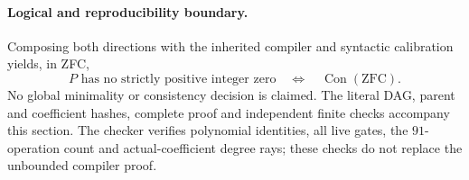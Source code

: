 \paragraph{Logical and reproducibility boundary.}
Composing both directions with the inherited compiler and syntactic
calibration yields, in ZFC,
\[
\text{$P$ has no strictly positive integer zero}
\quad\Longleftrightarrow\quad \operatorname{Con}(\mathrm{ZFC}).
\]
No global minimality or consistency decision is claimed. The literal DAG,
parent and coefficient hashes, complete proof and independent finite
checks accompany this section. The checker verifies polynomial identities,
all live gates, the $91$-operation count and actual-coefficient degree rays;
these checks do not replace the unbounded compiler proof.
